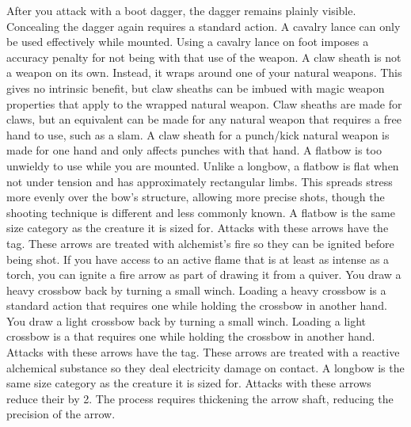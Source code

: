     After you attack with a boot dagger, the dagger remains plainly visible.
    Concealing the dagger again requires a standard action.
     A cavalry lance can only be used effectively while mounted.
    Using a cavalry lance on foot imposes a  accuracy penalty for not being  with that use of the weapon.
     A claw sheath is not a weapon on its own.
    Instead, it wraps around one of your natural weapons.
    This gives no intrinsic benefit, but claw sheaths can be imbued with magic weapon properties that apply to the wrapped natural weapon.
    Claw sheaths are made for claws, but an equivalent can be made for any natural weapon that requires a free hand to use, such as a slam.
    A claw sheath for a punch/kick natural weapon is made for one hand and only affects punches with that hand.
     A flatbow is too unwieldy to use while you are mounted.
    Unlike a longbow, a flatbow is flat when not under tension and has approximately rectangular limbs.
    This spreads stress more evenly over the bow's structure, allowing more precise shots, though the shooting technique is different and less commonly known.
    A flatbow is the same size category as the creature it is sized for.
     Attacks with these arrows have the \atFire tag.
    These arrows are treated with alchemist's fire so they can be ignited before being shot.
    If you have access to an active flame that is at least as intense as a torch, you can ignite a fire arrow as part of drawing it from a quiver.
     You draw a heavy crossbow back by turning a small winch.
    Loading a heavy crossbow is a standard action that requires one  while holding the crossbow in another hand.
     You draw a light crossbow back by turning a small winch.
    Loading a light crossbow is a  that requires one  while holding the crossbow in another hand.
     Attacks with these arrows have the \atElectricity tag.
    These arrows are treated with a reactive alchemical substance so they deal electricity damage on contact.
     A longbow is the same size category as the creature it is sized for.
     Attacks with these arrows reduce their  by 2.
    The process requires thickening the arrow shaft, reducing the precision of the arrow.

